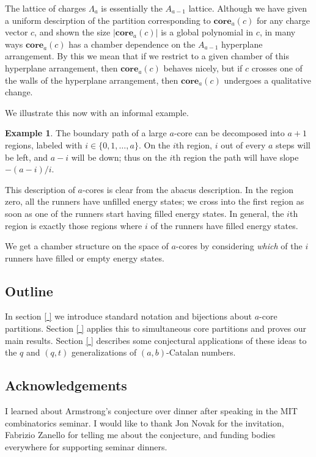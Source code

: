 \documentclass{amsart}[12pt]
\theoremstyle{definition}
\newtheorem{example}[dummy]{Example}
\newcommand{\core}{\mathbf{core}}
\begin{document}
The lattice of charges $\Lambda_a$ is essentially the $A_{a-1}$ lattice.  Although we have given a uniform descirption of the partition corresponding to $\core_a(c)$ for any charge vector $c$, and shown the size $|\core_a(c)|$ is a global polynomial in $c$, in many ways $\core_a(c)$ has a chamber dependence on the $A_{a-1}$ hyperplane arrangement.  By this we mean that if we restrict to a given chamber of this hyperplane arrangement, then $\core_a(c)$ behaves nicely, but if $c$ crosses one of the walls of the hyperplane arrangement, then $\core_a(c)$ undergoes a qualitative change.


We illustrate this now with an informal example.
\begin{example}
The boundary path of a large $a$-core can be decomposed into $a+1$ regions, labeled with $i\in\{0,1,\dots,a\}$.  On the $i$th region, $i$ out of every $a$ steps will be left, and $a-i$ will be down; thus on the $i$th region the path will have slope $-(a-i)/i$.  

This description of $a$-cores is clear from the abacus description.  In the region zero, all the runners have unfilled energy states; we cross into the first region as soon as one of the runners start having filled energy states.  In general, the $i$th region is exactly those regions where $i$ of the runners have filled energy states.  

We get a chamber structure on the space of $a$-cores by considering \emph{which} of the $i$ runners have filled or empty energy states.  



\end{example}




\subsection{Outline}
In section \ref{ } we introduce standard notation and bijections about $a$-core partitions.  Section \ref{ } applies this to simultaneous core partitions and proves our main results.  Section \ref{ } describes some conjectural applications of these ideas to the $q$ and $(q,t)$ generalizations of $(a,b)$-Catalan numbers.


\subsection{Acknowledgements}
I learned about Armstrong's conjecture over dinner after speaking in the MIT combinatorics seminar.  I would like to thank Jon Novak for the invitation, Fabrizio Zanello for telling me about the conjecture, and funding bodies everywhere for supporting seminar dinners.
\end{document}
